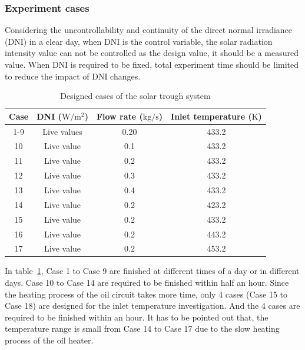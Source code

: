 \subsubsection{Experiment cases}


Considering the uncontrollability and continuity of the direct normal irradiance (DNI) in a clear day, when DNI is the control variable, the solar radiation intensity value can not be controlled as the design value, it should be a measured value. When DNI is required to be fixed, total experiment time should be limited to reduce the impact of DNI changes.

\begin{table}[htbp]\footnotesize
	\caption{Designed cases of the solar trough system}
	\begin{center}
	\begin{tabular}{cccc}
		\toprule
		Case	& DNI ($\mathrm{W/m^2}$)	&	Flow rate ($\mathrm{kg/s}$)			&	Inlet temperature ($\mathrm{K}$)\\
		\midrule
		1-9	&	Live values	&	0.20	&	433.2\\
		10	&	Live value	&	0.1	&	433.2\\
		11	&	Live value	&	0.2	&	433.2\\
		12	&	Live value	&	0.3	&	433.2\\
		13	&	Live value	&	0.4	&	433.2\\
		14	&	Live value	&	0.2	&	423.2\\
		15	&	Live value	&	0.2	&	433.2\\
		16	&	Live value	&	0.2	&	443.2\\
		17	&	Live value	&	0.2	&	453.2\\
		\bottomrule
	\end{tabular}
	\end{center}
	\label{tab:DesignedCasesForTrough}
\end{table}

In table~\ref{tab:DesignedCasesForTrough}, Case 1 to Case 9 are finished at different times of a day or in different days. Case 10 to Case 14 are required to be finished within half an hour. Since the heating process of the oil circuit takes more time, only 4 cases (Case 15 to Case 18) are designed for the inlet temperature investigation. And the 4 cases are required to be finished within an hour. It has to be pointed out that, the temperature range is small from Case 14 to Case 17 due to the slow heating process of the oil heater.

